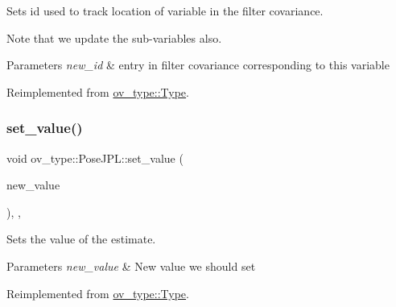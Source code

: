 Sets id used to track location of variable in the filter covariance. 

Note that we update the sub-\/variables also.


\begin{DoxyParams}{Parameters}
{\em new\+\_\+id} & entry in filter covariance corresponding to this variable \\
\hline
\end{DoxyParams}


Reimplemented from \hyperlink{classov__type_1_1Type_a52cb2fe6e25dbe8875da3fd618cf0b61}{ov\+\_\+type\+::\+Type}.

\mbox{\label{classov__type_1_1PoseJPL_a203f719544e8f3e11eb74b1b1458e3d6}} 
\subsubsection{\texorpdfstring{set\+\_\+value()}{set\_value()}}
{\footnotesize\ttfamily void ov\+\_\+type\+::\+Pose\+J\+P\+L\+::set\+\_\+value (\begin{DoxyParamCaption}\item[{const Eigen\+::\+Matrix\+Xd \&}]{new\+\_\+value }\end{DoxyParamCaption})\hspace{0.3cm}{\ttfamily [inline]}, {\ttfamily [override]}, {\ttfamily [virtual]}}



Sets the value of the estimate. 


\begin{DoxyParams}{Parameters}
{\em new\+\_\+value} & New value we should set \\
\hline
\end{DoxyParams}


Reimplemented from \hyperlink{classov__type_1_1Type_a81c73f0b6c10f2550a487019a59796a9}{ov\+\_\+type\+::\+Type}.

\mbox{\label{classov__type_1_1PoseJPL_ab1a626a94a9c7013a253dd16a2b6a0cc}} 
